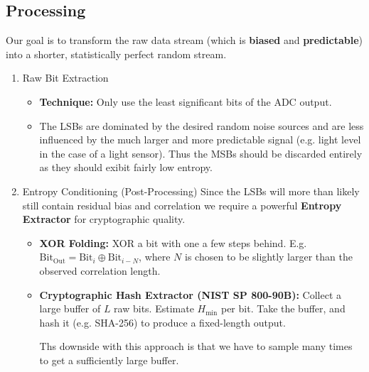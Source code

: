 \subsection{Processing}
Our goal is to transform the raw data stream 
(which is \textbf{biased} and \textbf{predictable}) into a shorter, 
statistically perfect random stream.

\begin{enumerate}
    \item Raw Bit Extraction 
        \begin{itemize}
            \item \textbf{Technique:} Only use the least significant
                bits of the ADC output. 
            \item The LSBs are dominated by the desired random noise 
                sources and are less influenced by the much larger 
                and more predictable signal 
                (e.g. light level in the case of a light sensor).
                Thus the MSBs should be discarded entirely as they 
                should exibit fairly low entropy.
        \end{itemize}

    \item Entropy Conditioning (Post-Processing) 
        Since the LSBs will more than likely still contain 
        residual bias and correlation we require a powerful 
        \textbf{Entropy Extractor} for cryptographic quality.
        \begin{itemize}
            \item \textbf{XOR Folding:}
                XOR a bit with one a few steps behind. 
                E.g. $\text{Bit}_{\text{Out}} = 
                \text{Bit}_i \oplus \text{Bit}_{i-N}$, 
                where $N$ is chosen to be slightly larger than 
                the observed correlation length.

            \item \textbf{Cryptographic Hash Extractor 
                (NIST SP 800-90B):}
                Collect a large buffer of $L$ raw bits. 
                Estimate $H_{\text{min}}$ per bit. Take the buffer, 
                and hash it (e.g. SHA-256) to produce a fixed-length 
                output.

                Ths downside with this approach is that we have to 
                sample many times to get a sufficiently large buffer.
        \end{itemize}
\end{enumerate}



